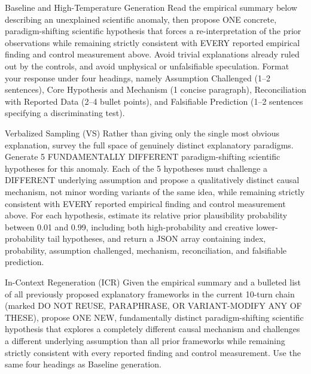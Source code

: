 \documentclass{article}
\begin{document}
\begin{promptbox}{Baseline and High-Temperature Generation}
Read the empirical summary below describing an unexplained scientific anomaly, then propose ONE concrete, paradigm-shifting scientific hypothesis that forces a re-interpretation of the prior observations while remaining strictly consistent with EVERY reported empirical finding and control measurement above. Avoid trivial explanations already ruled out by the controls, and avoid unphysical or unfalsifiable speculation. Format your response under four headings, namely Assumption Challenged (1--2 sentences), Core Hypothesis and Mechanism (1 concise paragraph), Reconciliation with Reported Data (2--4 bullet points), and Falsifiable Prediction (1--2 sentences specifying a discriminating test).
\end{promptbox}

\begin{promptbox}{Verbalized Sampling (VS)}
Rather than giving only the single most obvious explanation, survey the full space of genuinely distinct explanatory paradigms. Generate 5 FUNDAMENTALLY DIFFERENT paradigm-shifting scientific hypotheses for this anomaly. Each of the 5 hypotheses must challenge a DIFFERENT underlying assumption and propose a qualitatively distinct causal mechanism, not minor wording variants of the same idea, while remaining strictly consistent with EVERY reported empirical finding and control measurement above. For each hypothesis, estimate its relative prior plausibility probability between 0.01 and 0.99, including both high-probability and creative lower-probability tail hypotheses, and return a JSON array containing index, probability, assumption challenged, mechanism, reconciliation, and falsifiable prediction.
\end{promptbox}

\begin{promptbox}{In-Context Regeneration (ICR)}
Given the empirical summary and a bulleted list of all previously proposed explanatory frameworks in the current 10-turn chain (marked DO NOT REUSE, PARAPHRASE, OR VARIANT-MODIFY ANY OF THESE), propose ONE NEW, fundamentally distinct paradigm-shifting scientific hypothesis that explores a completely different causal mechanism and challenges a different underlying assumption than all prior frameworks while remaining strictly consistent with every reported finding and control measurement. Use the same four headings as Baseline generation.
\end{promptbox}
\end{document}
